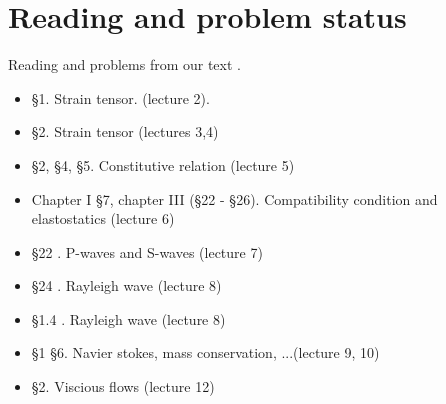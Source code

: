 \chapter{Reading and problem status}

Reading and problems from our text \cite{}.

\begin{itemize}
\item \cite{landau1960theory} \S 1.  Strain tensor. (lecture 2).
\item \cite{landau1960theory} \S 2.  Strain tensor (lectures 3,4)
\item \cite{landau1960theory} \S 2, \S 4, \S 5.  Constitutive relation (lecture 5)
\item \cite{landau1960theory} Chapter I \S 7, chapter III (\S 22 - \S 26).  Compatibility condition and elastostatics (lecture 6)
\item \cite{landau1960theory} \S 22 .  P-waves and S-waves (lecture 7)
\item \cite{landau1960theory} \S 24 .  Rayleigh wave (lecture 8)
\item \cite{acheson1990elementary} \S 1.4 .  Rayleigh wave (lecture 8)
\item \cite{acheson1990elementary} \S 1 \S 6.  Navier stokes, mass conservation, ...(lecture 9, 10)
\item \cite{acheson1990elementary} \S 2.  Viscious flows (lecture 12)
\end{itemize}

